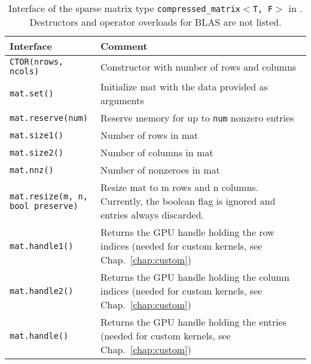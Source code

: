 \begin{table}[tb]
\begin{center}
\begin{tabular}{p{6.5cm}|p{8cm}}
Interface & Comment\\
\hline
\texttt{CTOR(nrows, ncols)}    & Constructor with number of rows and columns \\
\texttt{mat.set()}    & Initialize mat with the data provided as arguments \\
\texttt{mat.reserve(num)}    & Reserve memory for up to \texttt{num} nonzero entries \\

\texttt{mat.size1()}            & Number of rows in mat \\
\texttt{mat.size2()}            & Number of columns in mat \\
\texttt{mat.nnz()}		& Number of nonzeroes in mat \\
\parbox{6cm}{\texttt{mat.resize(m, n, \\
           \hphantom{mat.resize(}bool preserve)}}    & Resize mat to m rows and n columns. Currently, the boolean flag is ignored and entries always discarded. \\
\texttt{mat.handle1()}  & Returns the GPU handle holding the row indices (needed for custom kernels, see Chap.~\ref{chap:custom}) \\
\texttt{mat.handle2()}  & Returns the GPU handle holding the column indices  (needed for custom kernels, see Chap.~\ref{chap:custom}) \\
\texttt{mat.handle()}  & Returns the GPU handle holding the entries (needed for custom kernels, see Chap.~\ref{chap:custom})
\end{tabular}
\caption{Interface of the sparse matrix type \texttt{compressed\_matrix$<$T, F$>$} in \ViennaCL. Destructors and operator overloads for BLAS are not listed.}
\label{tab:compressed-matrix-interface}
\end{center}
\end{table}

